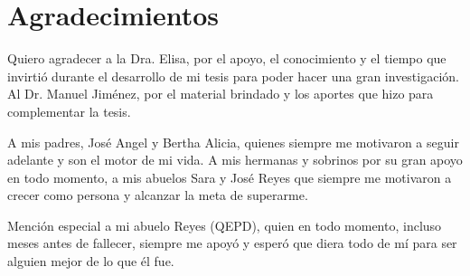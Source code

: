 
\chapter{Agradecimientos}

Quiero agradecer a la Dra. Elisa, por el apoyo, el conocimiento y el tiempo que invirtió durante el desarrollo de mi tesis para poder hacer una gran investigación. Al Dr. Manuel Jiménez, por el material brindado y los aportes que hizo para complementar la tesis. 

A mis padres, José Angel y Bertha Alicia, quienes siempre me motivaron a seguir adelante y son el motor de mi vida. A mis hermanas y sobrinos por su gran apoyo en todo momento, a mis abuelos Sara y José Reyes que siempre me motivaron a crecer como persona y alcanzar la meta de superarme.

Mención especial a mi abuelo Reyes (QEPD), quien en todo momento, incluso meses antes de fallecer, siempre me apoyó y esperó que diera todo de mí para ser alguien mejor de lo que él fue.


